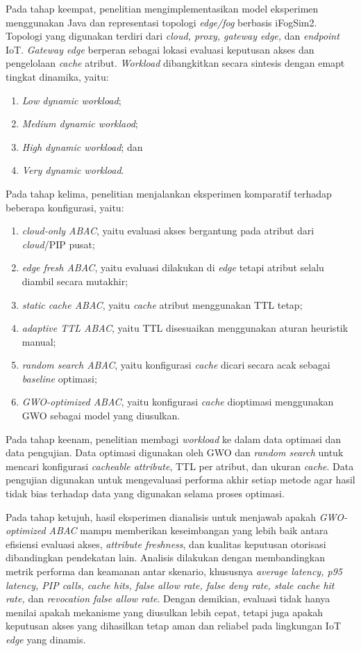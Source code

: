 Pada tahap keempat, penelitian mengimplementasikan model eksperimen menggunakan Java dan representasi topologi \textit{edge/fog} berbasis iFogSim2. Topologi yang digunakan terdiri dari \textit{cloud, proxy, gateway edge,} dan \textit{endpoint} IoT. \textit{Gateway edge} berperan sebagai lokasi evaluasi keputusan akses dan pengelolaan \textit{cache} atribut. \textit{Workload} dibangkitkan secara sintesis dengan emapt tingkat dinamika, yaitu:

\begin{enumerate}
    \item \textit{Low dynamic workload};
    \item \textit{Medium dynamic worklaod};
    \item \textit{High dynamic workload}; dan
    \item \textit{Very dynamic workload}.
\end{enumerate}

Pada tahap kelima, penelitian menjalankan eksperimen komparatif terhadap beberapa konfigurasi, yaitu:

\begin{enumerate}
    \item \textit{cloud-only ABAC}, yaitu evaluasi akses bergantung pada atribut dari \textit{cloud}/PIP pusat;
    \item \textit{edge fresh ABAC}, yaitu evaluasi dilakukan di \textit{edge} tetapi atribut selalu diambil secara mutakhir;
    \item \textit{static cache ABAC}, yaitu \textit{cache} atribut menggunakan TTL tetap;
    \item \textit{adaptive TTL ABAC}, yaitu TTL disesuaikan menggunakan aturan heuristik manual;
    \item \textit{random search ABAC}, yaitu konfigurasi \textit{cache} dicari secara acak sebagai \textit{baseline} optimasi;
    \item \textit{GWO-optimized ABAC}, yaitu konfigurasi \textit{cache} dioptimasi menggunakan GWO sebagai model yang diusulkan.
\end{enumerate}

Pada tahap keenam, penelitian membagi \textit{workload} ke dalam data optimasi dan data pengujian. Data optimasi digunakan oleh GWO dan \textit{random search} untuk mencari konfigurasi \textit{cacheable attribute}, TTL per atribut, dan ukuran \textit{cache}. Data pengujian digunakan untuk mengevaluasi performa akhir setiap metode agar hasil tidak bias terhadap data yang digunakan selama proses optimasi.

Pada tahap ketujuh, hasil eksperimen dianalisis untuk menjawab apakah \textit{GWO-optimized ABAC} mampu memberikan keseimbangan yang lebih baik antara efisiensi evaluasi akses, \textit{attribute freshness}, dan kualitas keputusan otorisasi dibandingkan pendekatan lain. Analisis dilakukan dengan membandingkan metrik performa dan keamanan antar skenario, khususnya \textit{average latency, p95 latency, PIP calls, cache hits, false allow rate, false deny rate, stale cache hit rate,} dan \textit{revocation false allow rate}. Dengan demikian, evaluasi tidak hanya menilai apakah mekanisme yang diusulkan lebih cepat, tetapi juga apakah keputusan akses yang dihasilkan tetap aman dan reliabel pada lingkungan IoT \textit{edge} yang dinamis.
